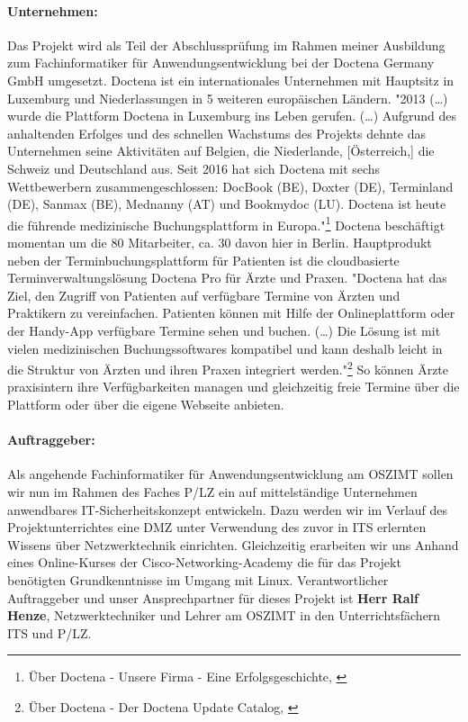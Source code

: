 \paragraph*{Unternehmen: }Das Projekt wird als Teil der Abschlussprüfung im Rahmen meiner Ausbildung zum Fachinformatiker für Anwendungsentwicklung bei der Doctena Germany GmbH umgesetzt. Doctena ist ein internationales Unternehmen mit Hauptsitz in Luxemburg und Niederlassungen in 5 weiteren europäischen Ländern.
"2013 (\dots) wurde die Plattform Doctena in Luxemburg ins Leben gerufen. (\dots) Aufgrund des anhaltenden Erfolges und des schnellen Wachstums des Projekts dehnte das Unternehmen seine Aktivitäten auf Belgien, die Niederlande, [Österreich,] die Schweiz und Deutschland aus. Seit 2016 hat sich Doctena mit sechs Wettbewerbern zusammengeschlossen: DocBook (BE), Doxter (DE), Terminland (DE), Sanmax (BE), Mednanny (AT) und Bookmydoc (LU). Doctena ist heute die führende medizinische Buchungsplattform in Europa."\footnote{Über Doctena - Unsere Firma - Eine Erfolgsgeschichte, \cite{wwwDoctenaComOne}}
Doctena beschäftigt momentan um die 80 Mitarbeiter, ca. 30 davon hier in Berlin. Hauptprodukt neben der Terminbuchungsplattform für Patienten ist die cloudbasierte Terminverwaltungslösung Doctena Pro für Ärzte und Praxen. "Doctena hat das Ziel, den Zugriff von Patienten auf verfügbare Termine von Ärzten und Praktikern zu vereinfachen. Patienten können mit Hilfe der Onlineplattform oder der Handy-App verfügbare Termine sehen und buchen. (\dots) Die Lösung ist mit vielen medizinischen Buchungssoftwares kompatibel und kann deshalb leicht in die Struktur von Ärzten und ihren Praxen integriert werden."\footnote{Über Doctena - Der Doctena Update Catalog, \cite{wwwDoctenaComTwo}}
So können Ärzte praxisintern ihre Verfügbarkeiten managen und gleichzeitig freie Termine über die Plattform oder über die eigene Webseite anbieten.

\paragraph*{Auftraggeber: }Als angehende Fachinformatiker für Anwendungsentwicklung am \ac{OSZIMT} sollen wir nun im Rahmen des Faches \ac{P/LZ} ein auf mittelständige Unternehmen anwendbares \ac{IT}-Sicherheitskonzept entwickeln. Dazu werden wir im Verlauf des Projektunterrichtes eine \ac{DMZ} unter Verwendung des zuvor in \ac{ITS} erlernten Wissens über Netzwerktechnik einrichten. Gleichzeitig erarbeiten wir uns Anhand eines Online-Kurses der Cisco-Networking-Academy die für das Projekt benötigten Grundkenntnisse im Umgang mit Linux. Verantwortlicher Auftraggeber und unser Ansprechpartner für dieses Projekt ist \textbf{Herr Ralf Henze}, Netzwerktechniker und Lehrer am \ac{OSZIMT} in den Unterrichtsfächern \ac{ITS} und \ac{P/LZ}.

